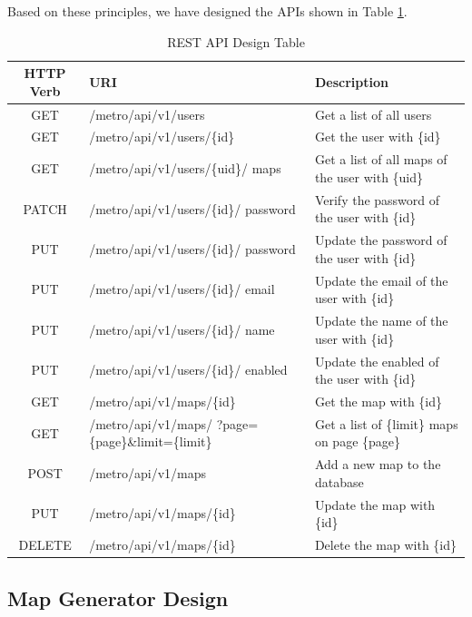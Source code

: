 Based on these principles, we have designed the APIs shown in Table \ref{REST API Design Table}.
\begin{table}[htb]
  \centering
  \begin{tabularx}{\textwidth}{>{\raggedright}cXX} %
    \toprule[1.5pt]
    \textbf{HTTP Verb} & \textbf{URI} & \textbf{Description}
    \\ \midrule[1.5pt]
    GET & /metro/api/v1/users & Get a list of all users
    \\ \midrule
    GET & /metro/api/v1/users/\{id\} & Get the user with \{id\}
    \\ \midrule
    GET & /metro/api/v1/users/\{uid\}/ maps & Get a list of all maps of the user with \{uid\}
    \\ \midrule
    PATCH & /metro/api/v1/users/\{id\}/ password & Verify the password of the user with \{id\}
    \\ \midrule
    PUT & /metro/api/v1/users/\{id\}/ password & Update the password of the user with \{id\}
    \\ \midrule
    PUT & /metro/api/v1/users/\{id\}/ email & Update the email of the user with \{id\} \\ \midrule
    PUT & /metro/api/v1/users/\{id\}/ name & Update the name of the user with \{id\} \\ \midrule
    PUT & /metro/api/v1/users/\{id\}/ enabled & Update the enabled of the user with \{id\}
    \\ \midrule
    GET & /metro/api/v1/maps/\{id\} & Get the map with \{id\}
    \\ \midrule
    GET & /metro/api/v1/maps/ ?page=\{page\}\&limit=\{limit\} & Get a list of \{limit\} maps on page \{page\}
    \\ \midrule
    POST & /metro/api/v1/maps & Add a new map to the database
    \\ \midrule
    PUT & /metro/api/v1/maps/\{id\} & Update the map with \{id\}
    \\ \midrule
    DELETE & /metro/api/v1/maps/\{id\} & Delete the map with \{id\}
    \\ \bottomrule[1.5pt]
  \end{tabularx}
  \caption[REST API Design Table]{REST API Design Table}
  \label{REST API Design Table}
\end{table}

\subsection{Map Generator Design}

